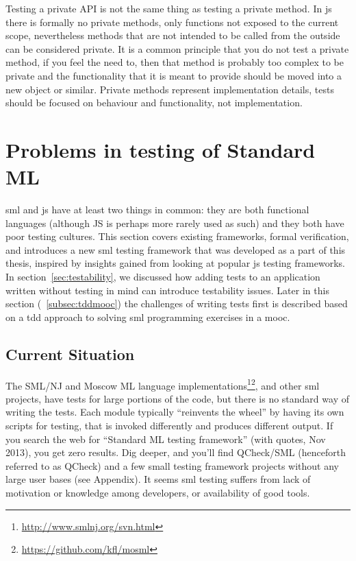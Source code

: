 \documentclass[11pt]{article}
\begin{document}
Testing a private API is not the same thing as testing a private method. In \gls{js} there is formally no private methods, only functions not exposed to the current scope, nevertheless methods that are not intended to be called from the outside can be considered private. It is a common principle that you do not test a private method, if you feel the need to, then that method is probably too complex to be private and the functionality that it is meant to provide should be moved into a new object or similar. Private methods represent implementation details, tests should be focused on behaviour and functionality, not implementation. \cite[questions~62-63]{Edelstam}

\section{Problems in testing of Standard ML}
\label{sec:smlproblems}

\Gls{sml} and \gls{js} have at least two things in common: they are both functional languages (although JS is perhaps more rarely used as such) and they both have poor testing cultures. This section covers existing frameworks, formal verification, and introduces a new \gls{sml} testing framework that was developed as a part of this thesis, inspired by insights gained from looking at popular \gls{js} testing frameworks. In section~\ref{sec:testability}, we discussed how adding tests to an application written without testing in mind can introduce testability issues. Later in this section (~\ref{subsec:tddmooc}) the challenges of writing tests first is described based on a \gls{tdd} approach to solving \gls{sml} programming exercises in a \gls{mooc}.

\subsection{Current Situation}

The SML/NJ and Moscow ML language implementations\footnote{\url{http://www.smlnj.org/svn.html}}\footnote{\url{https://github.com/kfl/mosml}}, and other \gls{sml} projects, have tests for large portions of the code, but there is no standard way of writing the tests. Each module typically ``reinvents the wheel'' by having its own scripts for testing, that is invoked differently and produces different output. If you search the web for ``Standard ML testing framework'' (with quotes, Nov 2013), you get zero results. Dig deeper, and you'll find QCheck/SML (henceforth referred to as QCheck) and a few small testing framework projects without any large user bases (see Appendix). It seems \gls{sml} testing suffers from lack of motivation or knowledge among developers, or availability of good tools. %
\end{document}
